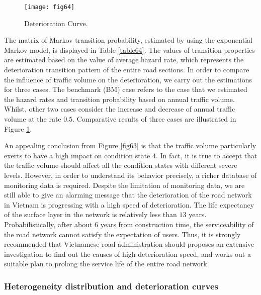 \begin{figure}[t]
\begin{center}
\texttt{[image: fig64]}
\end{center}
\caption{Deterioration Curve.}
\label{fig64}
\end{figure}

The matrix of Markov transition probability, estimated by using the exponential Markov model, is displayed in Table \ref{table64}. The values of transition properties are estimated based on the value of average hazard rate, which represents the deterioration transition pattern of the entire road sections. In order to compare the influence of traffic volume on the deterioration, we carry out the estimations for three cases. The benchmark (BM) case refers to the case that we estimated the hazard rates and transition probability based on annual traffic volume. Whilst, other two cases consider the increase and decrease of annual traffic volume at the rate $0.5$. Comparative results of three cases are illustrated in Figure \ref{fig64}.

An appealing conclusion from Figure \ref{fig63} is that the traffic volume particularly exerts to have a high impact on condition state $4$. In fact, it is true to accept that the traffic volume should affect all the condition states with different severe levels. However, in order to understand its behavior precisely, a richer database of monitoring data is required. Despite the limitation of monitoring data, we are still able to give an alarming message that the deterioration of the road network in Vietnam is progressing with a high speed of deterioration. The life expectancy of the surface layer in the network is relatively less than $13$ years. Probabilistically, after about $6$ years from construction time, the serviceability of the road network cannot satisfy the expectation of users. Thus, it is strongly recommended that Vietnamese road administration should proposes an extensive investigation to find out the causes of high deterioration speed, and works out a suitable plan to prolong the service life of the entire road network.
\subsubsection{Heterogeneity distribution and deterioration curves}
\label{6621}

